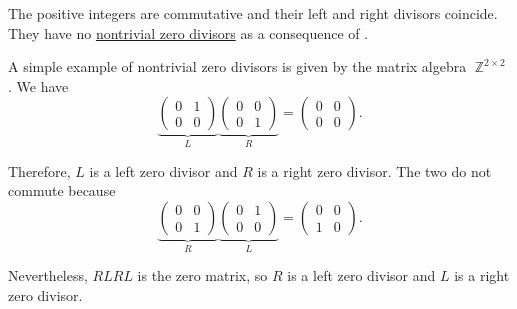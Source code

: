 \begin{example}\label{ex:def:divisibility}
  \hfill
  \begin{thmenum}
     The positive integers are commutative and their left and right divisors coincide. They have no \hyperref[def:divisibility/zero]{nontrivial zero divisors} as a consequence of .

     A simple example of nontrivial zero divisors is given by the matrix algebra \( \BbbZ^{2 \times 2} \). We have
    \begin{equation*}
      \underbrace
      {
        \begin{pmatrix}
          0 & 1 \\
          0 & 0
        \end{pmatrix}
      }_{L}
      \underbrace
      {
        \begin{pmatrix}
          0 & 0 \\
          0 & 1
        \end{pmatrix}
      }_{R}
      =
      \begin{pmatrix}
        0 & 0 \\
        0 & 0
      \end{pmatrix}.
    \end{equation*}

    Therefore, \( L \) is a left zero divisor and \( R \) is a right zero divisor. The two do not commute because
    \begin{equation*}
      \underbrace
      {
        \begin{pmatrix}
          0 & 0 \\
          0 & 1
        \end{pmatrix}
      }_{R}
      \underbrace
      {
        \begin{pmatrix}
          0 & 1 \\
          0 & 0
        \end{pmatrix}
      }_{L}
      =
      \begin{pmatrix}
        0 & 0 \\
        1 & 0
      \end{pmatrix}.
    \end{equation*}

    Nevertheless, \( RLRL \) is the zero matrix, so \( R \) is a left zero divisor and \( L \) is a right zero divisor.
  \end{thmenum}
\end{example}

